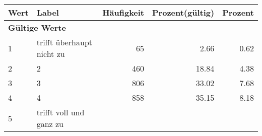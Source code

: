      \begin{longtable}{lXrrr}
     \toprule
     \textbf{Wert} & \textbf{Label} & \textbf{Häufigkeit} & \textbf{Prozent(gültig)} & \textbf{Prozent} \\
     \endhead
     \midrule
     \multicolumn{5}{l}{\textbf{Gültige Werte}}\\

     1 &
     \multicolumn{1}{X}{ trifft überhaupt nicht zu   } &


       \num{65} &
       \num[round-mode=places,round-precision=2]{2,66} &
         \num[round-mode=places,round-precision=2]{0,62} \\

     2 &
     \multicolumn{1}{X}{ 2   } &


       \num{460} &
       \num[round-mode=places,round-precision=2]{18,84} &
         \num[round-mode=places,round-precision=2]{4,38} \\

     3 &
     \multicolumn{1}{X}{ 3   } &


       \num{806} &
       \num[round-mode=places,round-precision=2]{33,02} &
         \num[round-mode=places,round-precision=2]{7,68} \\

     4 &
     \multicolumn{1}{X}{ 4   } &


       \num{858} &
       \num[round-mode=places,round-precision=2]{35,15} &
         \num[round-mode=places,round-precision=2]{8,18} \\

     5 &
     \multicolumn{1}{X}{ trifft voll und ganz zu   } &



\end{longtable}
